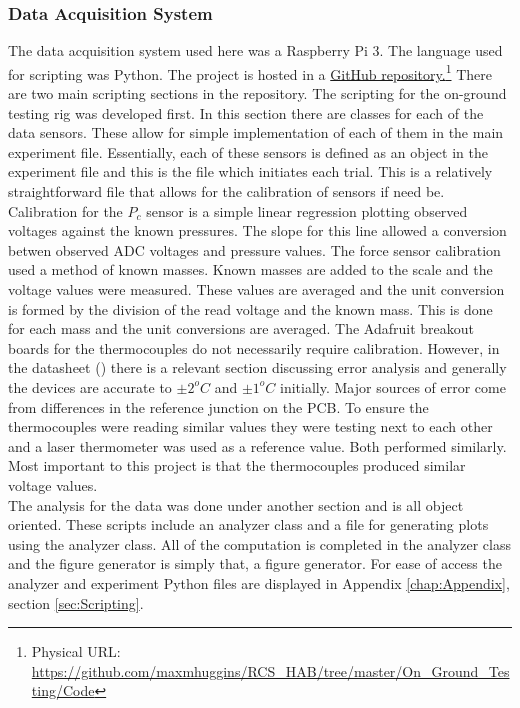 \subsubsection{Data Acquisition System}
The data acquisition system used here was a Raspberry Pi 3. The language used for scripting was Python. The project is hosted in a \href{https://github.com/maxmhuggins/RCS_HAB/tree/master/On_Ground_Testing/Code}{GitHub repository.}\footnote{Physical URL: \url{https://github.com/maxmhuggins/RCS_HAB/tree/master/On_Ground_Testing/Code}} There are two main scripting sections in the repository. The scripting for the on-ground testing rig was developed first. In this section there are classes for each of the data sensors. These allow for simple implementation of each of them in the main experiment file. Essentially, each of these sensors is defined as an object in the experiment file and this is the file which initiates each trial. This is a relatively straightforward file that allows for the calibration of sensors if need be. Calibration for the $P_c$ sensor is a simple linear regression plotting observed voltages against the known pressures. The slope for this line allowed a conversion betwen observed ADC voltages and pressure values. The force sensor calibration used a method of known masses. Known masses are added to the scale and the voltage values were measured. These values are averaged and the unit conversion is formed by the division of the read voltage and the known mass. This is done for each mass and the unit conversions are averaged. The Adafruit breakout boards for the thermocouples do not necessarily require calibration. However, in the datasheet (\cite{thermocouple}) there is a relevant section discussing error analysis and generally the devices are accurate to $\pm 2^oC$ and $\pm 1^oC$ initially. Major sources of error come from differences in the reference junction on the PCB. To ensure the thermocouples were reading similar values they were testing next to each other and a laser thermometer was used as a reference value. Both performed similarly. Most important to this project is that the thermocouples produced similar voltage values.\\
The analysis for the data was done under another section and is all object oriented. These scripts include an analyzer class and a file for generating plots using the analyzer class. All of the computation is completed in the analyzer class and the figure generator is simply that, a figure generator. For ease of access the analyzer and experiment Python files are displayed in Appendix \ref{chap:Appendix}, section \ref{sec:Scripting}.
